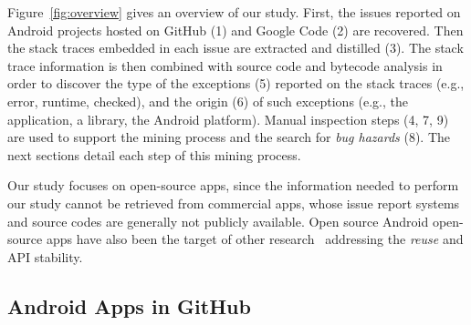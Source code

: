 \documentclass[conference]{IEEEtran}
\begin{document}
Figure~\ref{fig:overview} gives an overview of our study.
First,  the issues reported on Android projects hosted on GitHub (1) and Google Code (2) are recovered.
Then the stack traces embedded in each issue are extracted and distilled (3).
The stack trace information is then combined with source code and bytecode analysis in order to discover 
the type of the exceptions (5) reported on the stack traces (e.g., error, runtime, checked),
and the origin (6) of such exceptions 
(e.g., the application, a library, the Android platform). 
Manual inspection steps (4, 7, 9) are used to support the mining process  and 
the search for \emph{bug hazards}  (8). The next sections detail each step of this mining process.

Our study focuses on open-source apps, since the information needed to perform our study
cannot be retrieved from commercial apps, whose issue report systems and 
source codes are generally not publicly available. 
Open source Android open-source apps have also been the 
target of other research~\cite{Linar13,Ruiz12} addressing the \emph{reuse} and API stability. 




\subsection{Android Apps in GitHub}
\label{sec:git}
\end{document}
